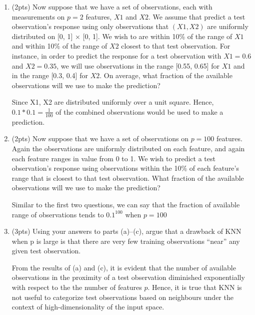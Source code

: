 \documentclass[a4paper]{article}
\theoremstyle{definition}
\newenvironment{soln}{
    \leavevmode\color{blue}\ignorespaces
}{}
\begin{document}
\begin{enumerate}
\begin{enumerate}
	
	\item (2pts) Now suppose that we have a set of observations, each with measurements on $p =2$ features, $X1$ and $X2$. We assume that predict a test observation’s response using only observations that $(X1,X2)$ are uniformly distributed on [0, 1] × [0, 1]. We wish to are within 10\% of the range of $X1$ and within 10\% of the range of $X2$ closest to that test observation. For instance, in order to predict the response for a test observation with $X1 =0.6$ and $X2 =0.35$, we will use observations in the range [0.55, 0.65] for $X1$ and in the range [0.3, 0.4] for $X2$. On average, what fraction of the available observations will we use to make the prediction?
	
	\begin{soln} Since X1, X2 are distributed uniformly over a unit square. Hence, $0.1*0.1 = \frac{1}{100}$ of the combined observations would be used to make a prediction.\end{soln}
	
	\item (2pts) Now suppose that we have a set of observations on $p = 100$ features. Again the observations are uniformly distributed on each feature, and again each feature ranges in value from 0 to 1. We wish to predict a test observation’s response using observations within the 10\% of each feature’s range that is closest to that test observation. What fraction of the available observations will we use to make the prediction?
	
	\begin{soln}  Similar to the first two questions, we can say that the fraction of available range of observations tends to $0.1^{100}$ when $p=100$ \end{soln}
	
	\item (3pts) Using your answers to parts (a)–(c), argue that a drawback of KNN when p is large is that there are very few training observations “near” any given test observation.
	
	\begin{soln}  From the results of (a) and (c), it is evident that the number of available observations in the proximity of a test observation diminished exponentially with respect to the the number of features $p$. Hence, it is true that KNN is not useful to categorize test observations based on neighbours under the context of high-dimensionality of the input space. \end{soln}
	

\end{enumerate}
\end{enumerate}
\end{document}
